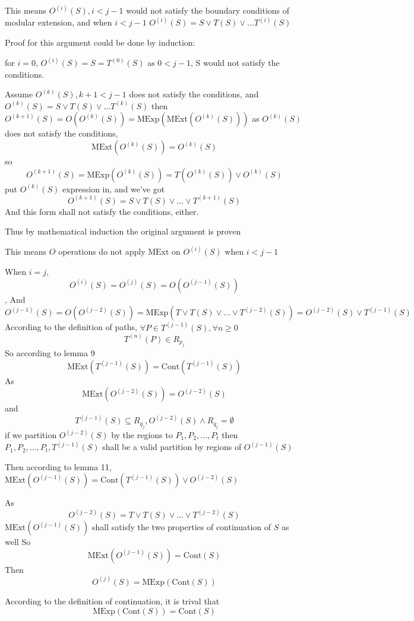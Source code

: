 \documentclass[letterpaper,]{article}
\begin{document}
This means \(O^{(i)}(S), i < j - 1\) would not satisfy the boundary
conditions of modular extension, and when \(i < j - 1\)
\(O^{(i)}(S) = S \lor T(S) \lor \dots T^{(i)}(S)\)

Proof for this argument could be done by induction:

for \(i = 0\), \(O^{(i)}(S) = S = T^{(0)}(S)\) as \(0 < j - 1\), S would
not satisfy the conditions.

Assume \(O^{(k)}(S), k + 1 < j - 1\) does not satisfy the conditions,
and \(O^{(k)}(S) = S \lor T(S) \lor \dots T^{(k)}(S)\) then
\(O^{(k+1)}(S) = O(O^{(k)}(S)) = \mathrm{MExp}(\mathrm{MExt}(O^{(k)}(S)))\)
as \(O^{(k)}(S)\) does not satisfy the conditions,
\[\mathrm{MExt}(O^{(k)}(S)) = O^{(k)}(S) \] so
\[O^{(k+1)}(S) = \mathrm{MExp}(O^{(k)}(S)) = T(O^{(k)}(S)) \lor O^{(k)}(S)\]
put \(O^{(k)}(S)\) expression in, and we've got
\[O^{(k+1)}(S) = S \lor T(S) \lor \dots \lor T^{(k+1)}(S)\] And this
form shall not satisfy the conditions, either.

Thus by mathematical induction the original argument is proven

This means \(O\) operations do not apply \(\mathrm{MExt}\) on
\(O^{(i)}(S)\) when \(i < j - 1\)

When \(i = j\), \[O^{(i)}(S) = O^{(j)}(S) = O(O^{(j - 1)}(S))\], And
\[O^{(j-1)}(S) = O(O^{(j-2)}(S)) = \mathrm{MExp}(T\lor T(S) \lor \dots \lor T^{(j-2)}(S)) = O^{(j-2)}(S)\lor T^{(j-1)}(S)\]
According to the definition of paths,
\(\forall P \in T^{(j-1)}(S), \forall n \ge 0\)
\[T^{(n)}(P) \in R_{p_j}\] So according to lemma 9
\[\mathrm{MExt}(T^{(j-1)}(S)) = \mathrm{Cont}(T^{(j-1)}(S)) \] As
\[\mathrm{MExt}(O^{(j-2)}(S)) = O^{(j-2)}(S)\] and
\[T^{(j-1)}(S)\subseteq R_{q_j}, O^{(j-2)}(S) \land R_{q_j}  = \emptyset\]
if we partition \(O^{(j-2)}(S)\) by the regions to
\(P_1, P_2, \dots, P_t\) then \(P_1, P_2, \dots, P_t, T^{(j-1)}(S)\)
shall be a valid partition by regions of \(O^{(j-1)}(S)\)

Then according to lemma 11,
\(\mathrm{MExt}(O^{(j-1)}(S)) = \mathrm{Cont}(T^{(j-1)}(S))\lor O^{(j-2)}(S)\)

As \[O^{(j-2)}(S) = T\lor T(S) \lor \dots \lor T^{(j-2)}(S)\]
\(\mathrm{MExt}(O^{(j-1)}(S))\) shall satisfy the two properties of
continuation of \(S\) as well So
\[\mathrm{MExt}(O^{(j-1)}(S)) = \mathrm{Cont}(S)\] Then
\[ O^{(j)}(S) = \mathrm{MExp}(\mathrm{Cont}(S))\]

According to the definition of continuation, it is trival that
\[\mathrm{MExp}(\mathrm{Cont}(S)) = \mathrm{Cont}(S)\]
\end{document}
